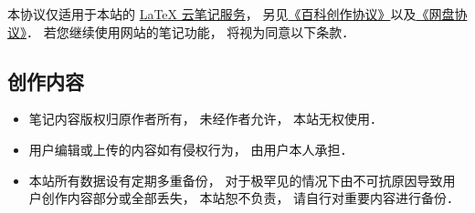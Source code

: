 
本协议仅适用于本站的 \href{http://example.com}{LaTeX 云笔记服务}， 另见\href{http://wuli.wiki/online/licens.html}{《百科创作协议》}以及\href{http://www.example.com}{《网盘协议》}． 若您继续使用网站的笔记功能， 将视为同意以下条款．

\subsection{创作内容}
\begin{itemize}
\item 笔记内容版权归原作者所有， 未经作者允许， 本站无权使用．
\item 用户编辑或上传的内容如有侵权行为， 由用户本人承担．
\item 本站所有数据设有定期多重备份， 对于极罕见的情况下由不可抗原因导致用户创作内容部分或全部丢失， 本站恕不负责， 请自行对重要内容进行备份．
\end{itemize}
